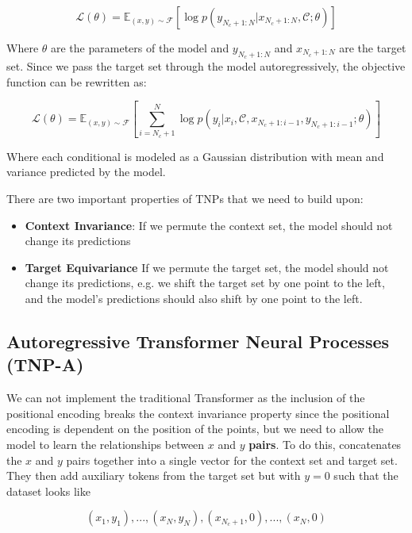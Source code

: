 \documentclass[../../main.tex]{subfiles}
\begin{document}
\begin{equation}
	\mathcal{L}(\theta) = \mathbb{E}_{(x, y) \sim \mathcal{F}} \left[ \log p(y_{N_c+1:N} | x_{N_c+1:N}, \mathcal{C}; \theta) \right]
	\end{equation}

Where $\theta$ are the parameters of the model and $y_{N_c+1:N}$ and $x_{N_c+1:N}$ are the target set. Since we pass the target set through the model autoregressively, the objective function can be rewritten as:

\begin{equation}
	\mathcal{L}(\theta) = \mathbb{E}_{(x, y) \sim \mathcal{F}} \left[ \sum_{i=N_c+1}^{N} \log p(y_i | x_i, \mathcal{C}, x_{N_c+1:i-1}, y_{N_c+1:i-1}; \theta) \right]
\end{equation}

Where each conditional is modeled as a Gaussian distribution with mean and variance predicted by the model. 

There are two important properties of TNPs that we need to build upon:

\begin{itemize}
	\item \textbf{Context Invariance}: If we permute the context set, the model should not change its predictions
	 \item \textbf{Target Equivariance} If we permute the target set, the model should not change its predictions, e.g. we shift the target set by one point to the left, and the model's predictions should also shift by one point to the left.
\end{itemize}

\subsection{Autoregressive Transformer Neural Processes (TNP-A)}

We can not implement the traditional Transformer as the inclusion of the positional encoding breaks the context invariance property since the positional encoding is dependent on the position of the points, but we need to allow the model to learn the relationships between $x$ and $y$ \textbf{pairs}. To do this, \cite{nguyen2023transformer} concatenates the $x$ and $y$ pairs together into a single vector for the context set and target set. They then add auxiliary tokens from the target set but with $y=0$ such that the dataset looks like

\[
	 {(x_1, y_1), . . . ,(x_N , y_N ),(x_{N_c+1}, 0), . . . ,(x_N , 0)}
\]
\end{document}
